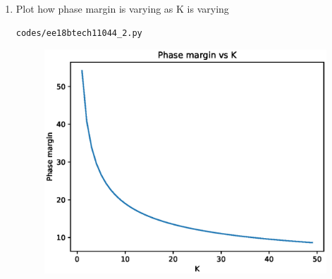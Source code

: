 \begin{enumerate}[label=\thesection.\arabic*.,ref=\thesection.\theenumi]
\item Plot how phase margin is varying as K is varying  \\ 
\solution
\begin{lstlisting}
codes/ee18btech11044_2.py
\end{lstlisting}

\begin{figure}[!ht]
\centering
\includegraphics[width=\columnwidth]{./figs/ee18btech11044_2.eps}
\end{figure}

\end{enumerate}
